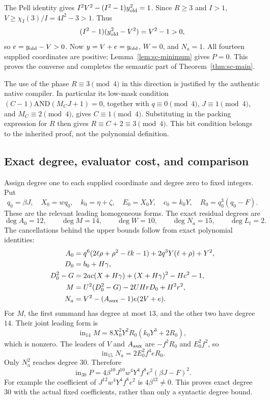 The Pell identity gives
$I^2V^2-(I^2-1)y_{\rm old}^2=1$.
Since $R\ge3$ and $I>1$,
$V\ge\chi_I(3)/I=4I^2-3>1$.  Thus
\[
 (I^2-1)(y_{\rm old}^2-V^2)=V^2-1>0,
\]
so $e=y_{\rm old}-V>0$.
Now $y=V+e=y_{\rm old}$, $W=0$, and $N_a=1$.
All fourteen supplied coordinates are positive; Lemma~\ref{lem:sc-minimum}
gives $P=0$.  This proves the converse and completes the semantic part of
Theorem~\ref{thm:sc-main}.

The use of the phase $R\equiv3\pmod4$ in this direction is justified
by the authentic native compiler.  In particular its low-mask condition
$(C-1)\mathbin{\mathrm{AND}}(M_CJ+1)=0$, together with
$q\equiv0\pmod4$, $J\equiv1\pmod4$, and $M_C\equiv2\pmod4$,
gives $C\equiv1\pmod4$.  Substituting in the packing expression for $R$
then gives $R\equiv C+2\equiv3\pmod4$.  This bit condition belongs to
the inherited proof, not the polynomial definition.

\subsection{Exact degree, evaluator cost, and comparison}

Assign degree one to each supplied coordinate and degree zero to fixed
integers.  Put
\[
 q_0=\beta J,\quad X_0=wq_0,\quad k_0=\eta+\zeta,
 \quad E_0=X_0Y,\quad c_0=k_0Y,\quad
 R_0=q_0^3(q_0-F).
\]
These are the relevant leading homogeneous forms.  The exact residual
degrees are
\[
 \deg A_0=12,\qquad \deg M=14,\qquad \deg W=10,
 \qquad \deg N_a=15,\qquad \deg L_t=2.
\]
The cancellations behind the upper bounds follow from exact polynomial
identities:
\begin{align*}
 A_0={}&q^6(2\ell\rho+\rho^2-\ell k-1)
           +2q^3Y(\ell+\rho)+Y^2,\\
 D_0={}&b_0+H\gamma,\\
 D_0^2-G={}&2ac(X+H\gamma)+(X+H\gamma)^2-Hc^2-1,\\
 M={}&U^2(D_0^2-G)-2UHrD_0+H^2r^2,\\
 N_a={}&V^2-(A_{\rm aux}-1)e(2V+e).
\end{align*}
For $M$, the first summand has degree at most $13$, and the other two
have degree $14$.  Their joint leading form is
\[
 \operatorname{in}_{14}M
       =8X_0^2Y^2R_0(k_0Y^3+2R_0),
\]
which is nonzero.  The leaders of $V$ and $A_{\rm aux}$ are
$-f^2R_0$ and $E_0^2f^2$, so
\[
 \operatorname{in}_{15}N_a=2E_0^2f^4eR_0.
\]
Only $N_a^2$ reaches degree $30$.  Therefore
\begin{equation}\label{eq:sc-leader}
 \operatorname{in}_{30}P
  =4\beta^{10}J^{10}w^4Y^4f^8e^2(\beta J-F)^2.
\end{equation}
For example the coefficient of $J^{12}w^4Y^4f^8e^2$ is
$4\beta^{12}\ne0$.  This proves exact degree $30$ with the actual
fixed coefficients, rather than only a syntactic degree bound.

